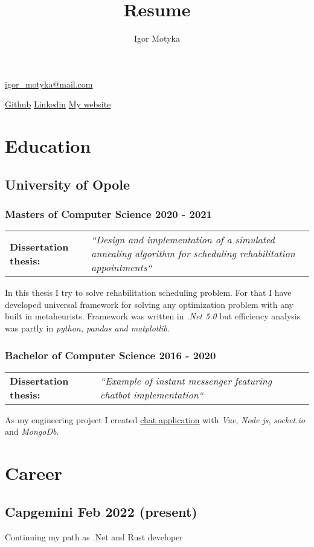 \documentclass[10pt]{article}
\author{Igor Motyka}
\title{Resume}
\makeatletter
\renewcommand{\maketitle}{
 \begin{center}
    \huge\bfseries\theauthor
 \end{center}
 \begin{center}
    \href{mailto:igor\_motyka@mail.com}{igor\_motyka@mail.com}\\
 \end{center}
 \begin{center}
	 \href{https://github.com/Anav0}{Github} \hspace{0.7cm} \href{https://www.linkedin.com/in/igor-m-873439168/}{Linkedin} \hspace{0.7cm} \href{https://igormotyka.netlify.app/}{My website}
 \end{center}
 }
\makeatother
\begin{document}
\maketitle

\section{Education}
\subsection{University of Opole}
\subsubsection{Masters of Computer Science 2020 - 2021}
\begin{table}[H]
    \begin{tabularx}{\textwidth}{@{}l X}
     \textbf{Dissertation thesis:} & \textit{``Design and implementation of a simulated annealing algorithm for scheduling rehabilitation appointments``} \\
    \end{tabularx}
\end{table}
\noindent In this thesis I try to solve rehabilitation scheduling problem. For that I have developed universal framework for solving any optimization problem with any built in metaheurists. Framework was written in \emph{.Net 5.0} but efficiency analysis was partly in \emph{python, pandas and matplotlib}.
\subsubsection{Bachelor of Computer Science 2016 - 2020}
\begin{table}[H]
    \begin{tabularx}{\textwidth}{@{}l X}
    \textbf{Dissertation thesis:} &  \textit{``Example of instant messenger featuring chatbot implementation``}\\
    \end{tabularx}
\end{table}
\noindent As my engineering project I created \href{https://www.behance.net/gallery/91600605/Gymba-chat}{chat application} with \emph{Vue}, \emph{Node js}, \emph{socket.io} and \emph{MongoDb}.
\section{Career}
\subsection{Capgemini Feb 2022 (present)}
Continuing my path as .Net and Rust developer
\end{document}
